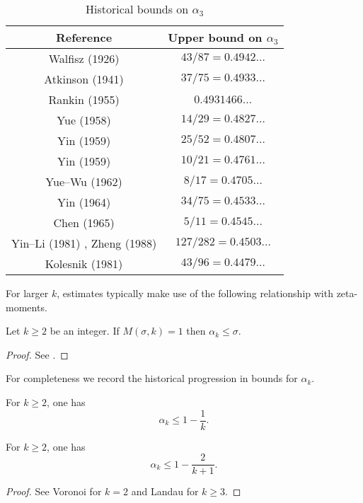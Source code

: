 \begin{table}[ht]
    \def\arraystretch{1.2}
    \centering
    \caption{Historical bounds on $\alpha_3$}
    \begin{tabular}{|c|c|}
    \hline
    Reference & Upper bound on $\alpha_3$\\
    \hline
    Walfisz (1926) \cite{walfisz_uber_1926} & $43/87 = 0.4942\ldots$\\
    \hline
    Atkinson (1941) \cite{atkinson_divisor_1941} & $37/75 = 0.4933\ldots$\\
    \hline
    Rankin (1955) \cite{rankin_van_1955} & $0.4931466\ldots$\\
    \hline
    Yue (1958) \cite{yuh_divisor_1958} & $14/29 = 0.4827\ldots$\\
    \hline 
    Yin (1959) \cite{Yin_divisor_25_52} & $25/52 = 0.4807\ldots$\\
    \hline 
    Yin (1959) \cite{Yin_divisor_10_21} & $10/21 = 0.4761\ldots$\\
    \hline
    Yue--Wu (1962) \cite{yuh_wu_divisor_1962} & $8/17 = 0.4705\ldots$\\
    \hline 
    Yin (1964) \cite{Yin_divisor_34_75} & $34/75 = 0.4533\ldots$\\
    \hline
    Chen (1965) \cite{chen_divisor_1965} & $5/11 = 0.4545\ldots$\\
    \hline
    Yin--Li (1981) \cite{Yin-Li_divisor_127_282}, Zheng (1988) \cite{Zheng_divisor_127_282} & $127/282 = 0.4503\ldots$\\
    \hline
    Kolesnik (1981) \cite{kolesnik} & $43/96 = 0.4479\ldots$\\
    \hline
    \end{tabular}
\label{div-alpha3-table}
\end{table}


For larger $k$, estimates typically make use of the following relationship with zeta-moments. 

\begin{lemma}\label{mas}  Let $k \geq 2$ be an integer. If $M(\sigma,k) = 1$ then $\alpha_k \leq \sigma$.
\end{lemma}

\begin{proof}  See \cite[\S 13.3]{ivic}.
\end{proof}

For completeness we record the historical progression in bounds for $\alpha_k$.  
\begin{lemma}\label{piltz-alpha}
For $k \ge 2$, one has
\[
\alpha_k \le 1 - \frac{1}{k}.
\]
\end{lemma}
\begin{lemma}\label{voronoi-alpha}
For $k \ge 2$, one has
\[
\alpha_k \leq 1 - \frac{2}{k + 1}.
\]
\end{lemma}
\begin{proof}
See Voronoi \cite{voronoi_sur_1903} for $k = 2$ and Landau \cite{landau_uber_1912} for $k \ge 3$. 
\end{proof}

